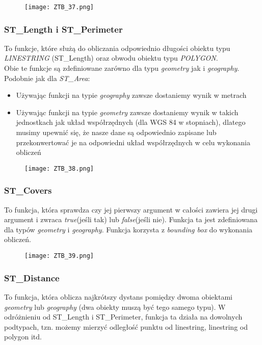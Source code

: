 \documentclass[a4paper,15pt]{article}
\newcommand{\example}[2]{
    \begin{tcolorbox}[colback=blue!5!white,colframe=blue,title={Przykład #1}]
        #2
    \end{tcolorbox}
}
\begin{document}
\example{}{
\begin{figure}[H]
\centering
  \texttt{[image: ZTB\_37.png]}
\end{figure}
}

\subsubsection{ST\_Length i ST\_Perimeter}

To funkcje, które służą do obliczania odpowiednio długości obiektu typu \textit{LINESTRING} (ST\_Length) oraz obwodu obiektu typu \textit{POLYGON}. \\

Obie te funkcje są zdefiniowane zarówno dla typu \textit{geometry} jak i \textit{geography}. Podobnie jak dla \textit{ST\_Area}:

\begin{itemize}
\item Używając funkcji na typie \textit{geography} zawsze dostaniemy wynik w metrach
\item Używając funkcji na typie \textit{geometry} zawsze dostaniemy wynik w takich jednostkach jak układ współrzędnych (dla WGS 84 w stopniach), dlatego musimy upewnić się, że nasze dane są odpowiednio zapisane lub przekonwertować je na odpowiedni układ współrzędnych w celu wykonania obliczeń
\end{itemize}

\example{}{
\begin{figure}[H]
\centering
  \texttt{[image: ZTB\_38.png]}
\end{figure}
}


\subsubsection{ST\_Covers}

To funkcja, która sprawdza czy jej pierwszy argument w całości zawiera jej drugi argument i zwraca \textit{true}(jeśli tak) lub \textit{false}(jeśli nie). Funkcja ta jest zdefiniowana dla typów \textit{geometry} i \textit{geography}. Funkcja korzysta z \textit{bounding box} do wykonania obliczeń.

\example{}{
\begin{figure}[H]
\centering
  \texttt{[image: ZTB\_39.png]}
\end{figure}
} 

\subsubsection{ST\_Distance}
To funkcja, która oblicza najkrótszy dystans pomiędzy dwoma obiektami \textit{geometry} lub \textit{geography} (dwa obiekty muszą być tego samego typu). W odróżnieniu od ST\_Length i ST\_Perimeter, funkcja ta działa na dowolnych podtypach, tzn. możemy mierzyć odległość punktu od linestring, linestring od polygon itd.  \\
\end{document}
